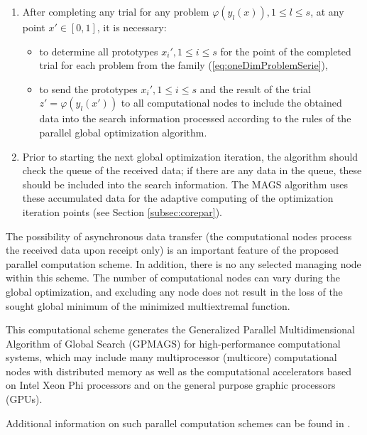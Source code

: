 \documentclass{aims}
\theoremstyle{definition}
\begin{document}
\begin{enumerate}
\begin{enumerate}
\begin{itemize}
    \end{itemize}
    \item After completing any trial for any problem \(\varphi(y_l(x)),1\leq l\leq s\),
    at any point \(x'\in[0,1]\), it is necessary:
    \begin{itemize}
      \item to determine all prototypes \(x_i',1\leq i\leq s\) for the point of the
      completed trial for each problem from the family (\ref{eq:oneDimProblemSerie}),
      \item to send the prototypes \(x_i',1\leq i\leq s\) and the result of the trial
      \(z'=\varphi(y_l(x'))\) to all computational nodes to include the obtained data into
      the search information processed according to the rules of the parallel global optimization algorithm.
    \end{itemize}
    \item Prior to starting the next global optimization iteration, the algorithm
    should check the queue of the received data; if there are any data in the queue,
    these should be included into the search information. The MAGS algorithm uses these
    accumulated data for the adaptive computing of the optimization iteration points (see Section \ref{subsec:corepar}).
\end{enumerate}
\end{enumerate}
\par
The possibility of asynchronous data transfer (the computational nodes process the received
data upon receipt only) is an important feature of the proposed parallel computation scheme.
In addition, there is no any selected managing node within this scheme. The number of
computational nodes can vary during the global optimization, and excluding any node does not result
in the loss of the sought global minimum of the minimized multiextremal function.
\par
This computational scheme generates the Generalized Parallel Multidimensional Algorithm of
Global Search (GPMAGS) for high-performance computational systems, which may include many
multiprocessor (multicore) computational nodes with distributed memory as well as the
computational accelerators based on Intel Xeon Phi processors and on the general purpose graphic processors (GPUs).
\par
Additional information on such parallel computation schemes can be found in \cite{gergelSidorov2015}.
\end{document}
